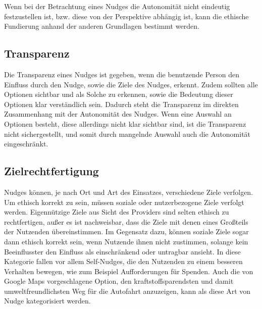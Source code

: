 Wenn bei der Betrachtung eines Nudges die Autonomität nicht eindeutig festzustellen ist, bzw. diese von der Perspektive abhängig ist, kann die ethische Fundierung anhand der anderen Grundlagen bestimmt werden.
\subsection{Transparenz}
Die Transparenz eines Nudges ist gegeben, wenn die benutzende Person den Einfluss durch den Nudge, sowie die Ziele des Nudges, erkennt. Zudem sollten alle Optionen sichtbar und als Solche zu erkennen, sowie die Bedeutung dieser Optionen klar verständlich sein. \parencite[S. 89]{Reisch.2020} Dadurch steht die Transparenz im direkten Zusammenhang mit der Autonomität des Nudges. Wenn eine Auswahl an Optionen besteht, diese allerdings nicht klar sichtbar sind, ist die Transparenz nicht sichergestellt, und somit durch mangelnde Auswahl auch die Autonomität eingeschränkt.
\subsection{Zielrechtfertigung}
Nudges können, je nach Ort und Art des Einsatzes, verschiedene Ziele verfolgen. Um ethisch korrekt zu sein, müssen soziale oder nutzerbezogene Ziele verfolgt werden. Eigennützige Ziele aus Sicht des Providers sind selten ethisch zu rechtfertigen, außer es ist nachweisbar, dass die Ziele mit denen eines Großteils der Nutzenden übereinstimmen. Im Gegensatz dazu, können soziale Ziele sogar dann ethisch korrekt sein, wenn Nutzende ihnen nicht zustimmen, solange kein Beeinflusster den Einfluss als einschränkend oder untragbar ansieht. \parencite[S. 89]{Reisch.2020}\parencite[S. 7]{Lembcke.2019} In diese Kategorie fallen vor allem Self-Nudges, die den Nutzenden zu einem besseren Verhalten bewegen, wie zum Beispiel Aufforderungen für Spenden. Auch die von Google Maps vorgeschlagene Option, den kraftstoffsparendsten und damit umweltfreundlichsten Weg für die Autofahrt anzuzeigen, kann als diese Art von Nudge kategorisiert werden.